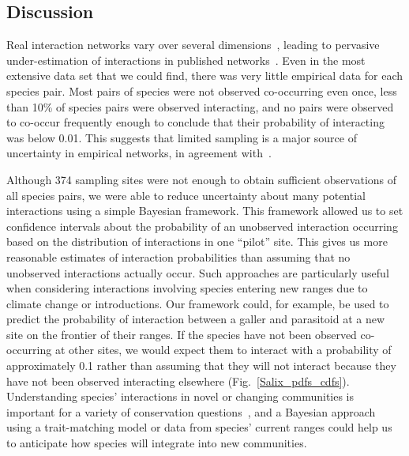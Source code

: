 \documentclass[12pt]{article}
\begin{document}
\begin{spacing}{1.5}

\section*{Discussion}


  Real interaction networks vary over several dimensions~\citep{Kitching1987,Olesen2011a,Pires2011a,Baiser2012,Fodrie2015,Novak2015}, leading to pervasive under-estimation of interactions in published networks~\citep{Jordano2016}. Even in the most extensive data set that we could find, there was very little empirical data for each species pair. Most pairs of species were not observed co-occurring even once, less than 10\% of species pairs were observed interacting, and no pairs were observed to co-occur frequently enough to conclude that their probability of interacting was below 0.01. This suggests that limited sampling is a major source of uncertainty in empirical networks, in agreement with~\citet{Jordano2016,Weinstein2017a}. 


  Although 374 sampling sites were not enough to obtain sufficient observations of all species pairs, we were able to reduce uncertainty about many potential interactions using a simple Bayesian framework. This framework allowed us to set confidence intervals about the probability of an unobserved interaction occurring based on the distribution of interactions in one ``pilot'' site. This gives us more reasonable estimates of interaction probabilities than assuming that no unobserved interactions actually occur. Such approaches are particularly useful when considering interactions involving species entering new ranges due to climate change or introductions. Our framework could, for example, be used to predict the probability of interaction between a galler and parasitoid at a new site on the frontier of their ranges. If the species have not been observed co-occurring at other sites, we would expect them to interact with a probability of approximately 0.1 rather than assuming that they will not interact because they have not been observed interacting elsewhere (Fig.~\ref{Salix_pdfs_cdfs}). Understanding species' interactions in novel or changing communities is important for a variety of conservation questions~\citep{Bartomeus2013,Gravel2013}, and a Bayesian approach using a trait-matching model or data from species' current ranges could help us to anticipate how species will integrate into new communities. 



\end{spacing}
\end{document}
